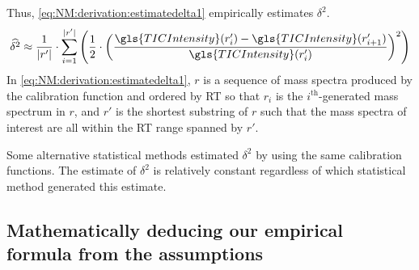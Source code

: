 Thus, \cref{eq:NM:derivation:estimatedelta1} empirically estimates \(\delta^2\).
\begin{align}
\widehat{\delta^2} \approx \frac{1}{\lvert r'\rvert}\cdot\sum_{i=1}^{\lvert r'\rvert} 
	\left(\frac{1}{2}\cdot\left(\frac{\gls{TICIntensity}(r_i') - \gls{TICIntensity}(r_{i+1}')}{\gls{TICIntensity}(r_i')}\right)^2\right)
	\label{eq:NM:derivation:estimatedelta1}
\end{align}
In \cref{eq:NM:derivation:estimatedelta1},
	\(r\) is a sequence of mass spectra produced by the calibration function and ordered by \gls{RT} so that \(r_i\) is the \(i^{\text{th}}\)-generated mass spectrum in \(r\), 
	and \(r'\) is the shortest substring of \(r\) such that the mass spectra of interest are all within the \gls{RT} range spanned by \(r'\).

Some alternative statistical methods estimated \(\delta^2\) by using the same calibration functions.{}
The estimate of \(\delta^2\) is relatively constant regardless of which statistical method generated this estimate.

\subsection{Mathematically deducing our empirical formula from the assumptions}

